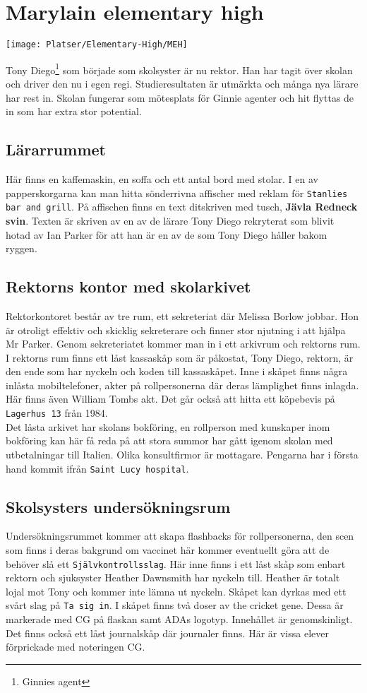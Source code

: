 \documentclass[a5paper,10pt]{report}
\begin{document}
\section{Marylain elementary high}
\texttt{[image: Platser/Elementary-High/MEH]}

Tony Diego\footnote{Ginnies agent} som började som skolsyster är nu rektor. Han har tagit över skolan och driver den nu i egen regi. Studieresultaten är utmärkta och många nya lärare har rest in. Skolan fungerar som mötesplats för Ginnie agenter och hit flyttas de in som har extra stor potential.
\subsection{Lärarrummet}
Här finns en kaffemaskin, en soffa och ett antal bord med stolar. I en av papperskorgarna kan man hitta sönderrivna affischer med reklam för \texttt{Stanlies bar and grill}. På affischen finns en text ditskriven med tusch, \textbf{Jävla Redneck svin}. Texten är skriven av en av de lärare Tony Diego rekryterat som blivit hotad av Ian Parker för att han är en av de som Tony Diego håller bakom ryggen.
\subsection{Rektorns kontor med skolarkivet}
Rektorkontoret består av tre rum, ett sekreteriat där Melissa Borlow jobbar. Hon är otroligt effektiv och skicklig sekreterare och finner stor njutning i att hjälpa Mr Parker. Genom sekreteriatet kommer man in i ett arkivrum och rektorns rum.\\

I rektorns rum finns ett låst kassaskåp som är påkostat, Tony Diego, rektorn, är den ende som har nyckeln och koden till kassaskåpet. Inne i skåpet finns några inlåsta mobiltelefoner, akter på rollpersonerna där deras lämplighet finns inlagda. Här finns även William Tombs akt. Det går också att hitta ett köpebevis på \texttt{Lagerhus 13} från 1984.\\

Det låsta arkivet har skolans bokföring, en rollperson med kunskaper inom bokföring kan här få reda på att stora summor har gått igenom skolan med utbetalningar till Italien. Olika konsultfirmor är mottagare. Pengarna har i första hand kommit ifrån \texttt{Saint Lucy hospital}.\\

\subsection{Skolsysters undersökningsrum}
Undersökningsrummet kommer att skapa flashbacks för rollpersonerna, den scen som finns i deras bakgrund om vaccinet här kommer eventuellt göra att de behöver slå ett \texttt{Självkontrollsslag}. Här inne finns i ett låst skåp som enbart rektorn och sjuksyster Heather Dawnsmith har nyckeln till. Heather är totalt lojal mot Tony och kommer inte lämna ut nyckeln. Skåpet kan dyrkas med ett svårt slag på \texttt{Ta sig in}. I skåpet finns två doser av the cricket gene. Dessa är markerade med CG på flaskan samt ADAs logotyp. Innehållet är genomskinligt. Det finns också ett låst journalskåp där journaler finns. Här är vissa elever förprickade med noteringen CG.
\end{document}
